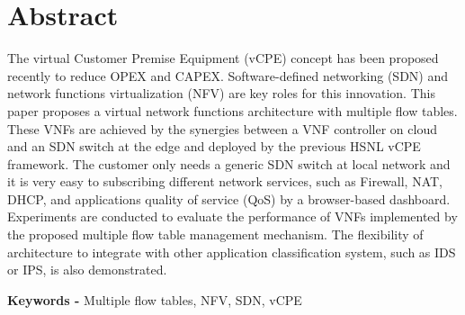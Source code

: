 \chapter*{Abstract}
The virtual Customer Premise Equipment (vCPE) concept has been proposed recently to reduce OPEX and CAPEX. Software-defined networking (SDN) and network functions virtualization (NFV) are key roles for this innovation. This paper proposes a virtual network functions architecture with multiple flow tables. These VNFs are achieved by the synergies between a VNF controller on cloud and an SDN switch at the edge and deployed by the previous HSNL vCPE framework. The customer only needs a generic SDN switch at local network and it is very easy to subscribing different network services, such as Firewall, NAT,  DHCP, and applications quality of service (QoS) by a browser-based dashboard. Experiments are conducted to evaluate the performance of VNFs implemented by the proposed multiple flow table management mechanism. The flexibility of architecture to integrate with other application classification system, such as IDS or IPS, is also demonstrated.

\noindent \textbf{Keywords - }{Multiple flow tables, NFV, SDN, vCPE }
